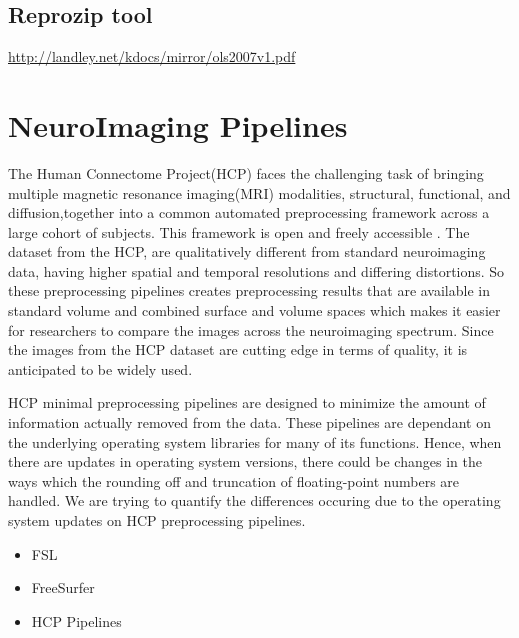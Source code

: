 \subsection{Reprozip tool}
\hyperref[System Call Interception]{http://landley.net/kdocs/mirror/ols2007v1.pdf}

\section{NeuroImaging Pipelines}
The Human Connectome Project(HCP) faces the challenging task of bringing multiple magnetic resonance imaging(MRI) modalities, structural, functional, and diffusion,together into a common automated preprocessing framework across a large cohort of subjects. This framework is open and freely accessible \cite{Gla13}. The dataset from the HCP, are qualitatively different from standard neuroimaging data, having higher spatial and temporal resolutions and differing distortions. So these preprocessing pipelines creates preprocessing results that are available in standard volume and combined surface and volume spaces which makes it easier for researchers to compare the images across the neuroimaging spectrum. Since the images from the HCP dataset are cutting edge in terms of quality, it is anticipated to be widely used.

HCP minimal preprocessing pipelines are designed to minimize the amount of information actually removed from the data. These pipelines are dependant on the underlying operating system libraries for many of its functions. Hence, when there are updates in operating system versions, there could be changes in the ways which the rounding off and truncation of floating-point numbers are handled. We are trying to quantify the differences occuring due to the operating system updates on HCP preprocessing pipelines.

\begin{itemize}
 \item FSL
 \item FreeSurfer
 \item HCP Pipelines
\end{itemize}


